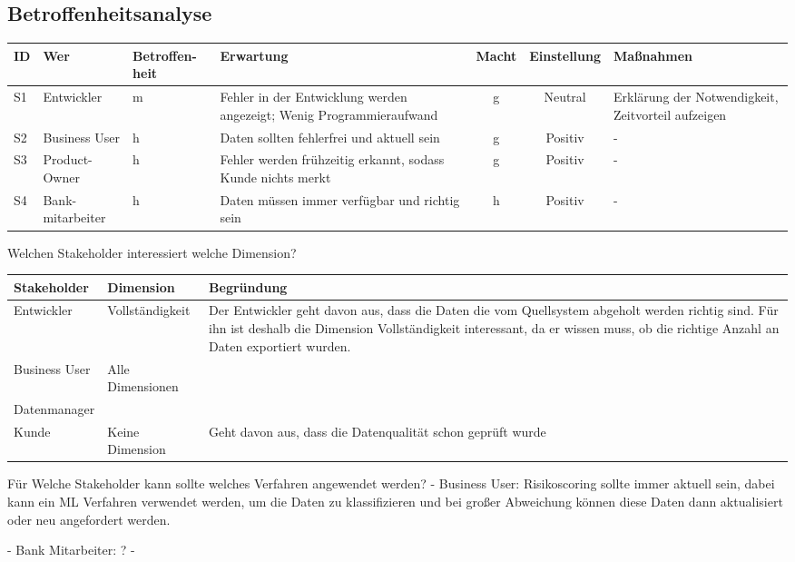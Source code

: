 \subsection{Betroffenheitsanalyse}
\begin{tabular}[h]{l|p{2cm}|>{\centering}p{1.5cm}|p{2.5cm}|c|c|p{3cm}}
ID & Wer        & Betroffen-heit & Erwartung & Macht & Einstellung & Maßnahmen  \\ \hline
S1 & Entwickler & m             & Fehler in der Entwicklung werden angezeigt; Wenig Programmieraufwand & g & Neutral & Erklärung der Notwendigkeit, Zeitvorteil aufzeigen  \\ \hline
S2 & Business User & h          & Daten sollten fehlerfrei und aktuell sein & g & Positiv & - \\ \hline
S3 & Product-Owner & h          & Fehler werden frühzeitig erkannt, sodass Kunde nichts merkt & g & Positiv & - \\ \hline
S4 & Bank-mitarbeiter & h          & Daten müssen immer verfügbar und richtig sein & h & Positiv & - \\
\end{tabular}


Welchen Stakeholder interessiert welche Dimension?

\begin{tabular}[h]{l|l|l}
Stakeholder & Dimension & Begründung \\ \hline
Entwickler & Vollständigkeit & Der Entwickler geht davon aus, dass die Daten die vom Quellsystem abgeholt werden richtig sind. Für ihn ist deshalb die Dimension Vollständigkeit interessant, da er wissen muss, ob die richtige Anzahl an Daten exportiert wurden. \\ \hline
Business User & Alle Dimensionen & \\ \hline
Datenmanager & & \\ \hline
Kunde & Keine Dimension & Geht davon aus, dass die Datenqualität schon geprüft wurde \\
\end{tabular}


Für Welche Stakeholder kann sollte welches Verfahren angewendet werden?
- Business User: Risikoscoring sollte immer aktuell sein, dabei kann ein ML Verfahren verwendet werden, um die Daten zu klassifizieren und bei großer Abweichung können diese Daten dann aktualisiert oder neu angefordert werden.

- Bank Mitarbeiter: ?
- 


